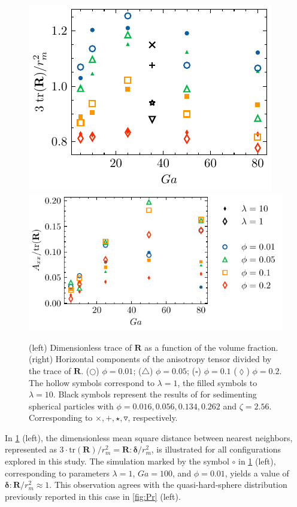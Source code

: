 \documentclass[11pt]{My_preprint}
\providecommand{\DIFadd}[1]{{\protect\color{blue}\uwave{#1}}} %
\providecommand{\DIFdel}[1]{{\protect\color{red}\sout{#1}}}                      %
\providecommand{\DIFaddbegin}{} %
\providecommand{\DIFaddend}{} %
\providecommand{\DIFdelbegin}{} %
\providecommand{\DIFdelend}{} %
\providecommand{\DIFaddbeginFL}{} %
\providecommand{\DIFaddendFL}{} %
\providecommand{\DIFdelbeginFL}{} %
\providecommand{\DIFdelendFL}{} %
\begin{document}
\begin{figure}[h!]
    \centering
    \DIFdelbeginFL %
\DIFdelendFL \DIFaddbeginFL \includegraphics[height=0.3\textwidth]{image/HOMOGENEOUS_final/PA/trR.pdf}
    \includegraphics[height=0.3\textwidth]{image/HOMOGENEOUS_final/PA/Axx.pdf}
    \DIFaddendFL \caption{
        (left) Dimensionless trace of $\textbf{R}$ as a function of the volume fraction.(right) Horizontal components of the anisotropy tensor divided by the trace of $\textbf{R}$. ($\pmb\bigcirc$) $\phi = 0.01$; ($\pmb\triangle$) $ \phi = 0.05$; ($\pmb\square$) $\phi = 0.1$ ($\pmb\lozenge$) $\phi = 0.2$.
    The hollow symbols correspond to $\lambda = 1$, the filled symbols to $\lambda = 10$.
Black symbols represent the results of \citet{zhang2023evolution} for sedimenting spherical particles with $\phi = 0.016,0.056,0.134,0.262$ and $\zeta = 2.56$. Corresponding to $\pmb\times,\pmb +, \pmb\star , \pmb\triangledown$, respectively.
    }
    \label{fig:A}
\end{figure}
In \ref{fig:A} (left), the dimensionless mean square distance between nearest neighbors, represented as $3\cdot\text{tr}(\textbf{R})/r_m^2 = \textbf{R}:\bm\delta/r_m^2$, is illustrated for all configurations explored in this study. 
The simulation marked by the symbol \textcolor{col1}{$\pmb\circ$} in \ref{fig:A} (left), corresponding to parameters $\lambda = 1$, \DIFdelbegin \DIFdel{$Ga = 100$}\DIFdelend \DIFaddbegin \DIFadd{$Ga = 80$}\DIFaddend , and $\phi = 0.01$, yields a value of $\bm\delta:\textbf{R}/r_m^2 \approx 1$. 
This observation agrees with the quasi-hard-sphere distribution previously reported in this case in \ref{fig:Pr} (left).
\end{document}
